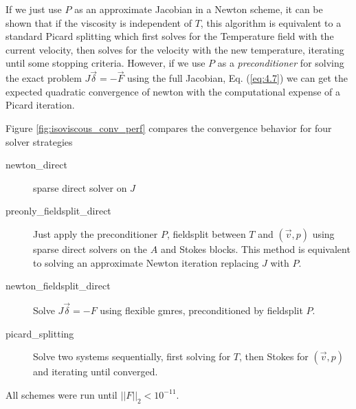 If we just use $P$ as an approximate Jacobian in a Newton scheme, it
can be shown that if the  viscosity is independent of $T$, this
algorithm is equivalent to a standard Picard splitting which first
solves for the  Temperature field with the current velocity,  then
solves for the velocity with the new temperature,  iterating until
some stopping criteria. However,  if we use $P$ as a
\emph{preconditioner} for solving the exact problem
$J\vec{\delta}=-\vec{F}$ using the full Jacobian,
Eq. (\ref{eq:4.7})  we can  get the expected quadratic
convergence of newton with the computational expense of a Picard
iteration.

Figure \ref{fig:isoviscous_conv_perf} compares the
convergence behavior for four solver strategies 
\begin{description}
\item[newton\_direct]  sparse direct solver on $J$
\item[preonly\_fieldsplit\_direct] Just apply the  preconditioner $P$,
  fieldsplit between $T$ and
  $(\vec{v},p)$ using sparse direct
  solvers on the $A$ and Stokes blocks.  This method is equivalent to solving an approximate Newton
  iteration replacing $J$ with $P$.
\item[newton\_fieldsplit\_direct]  Solve $J\vec{\delta}=-F$ using
  flexible gmres, preconditioned by fieldsplit $P$.
\item[picard\_splitting] Solve two systems sequentially, first solving
  for $T$, then Stokes for $(\vec{v},p)$ and iterating until converged.
\end{description}
All schemes were run until $||F||_{2}<10^{-11}$.  

